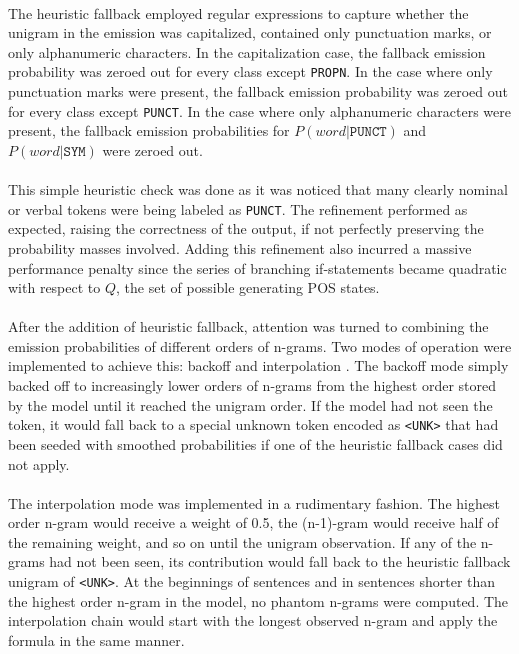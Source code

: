 \documentclass[11pt,a4paper]{article}
\begin{document}
\paragraph{}
The heuristic fallback employed regular expressions to capture whether the unigram
in the emission was capitalized, contained only punctuation marks, or only alphanumeric
characters. In the capitalization case, the fallback emission probability was zeroed out
for every class except \texttt{PROPN}. In the case where only punctuation marks were
present, the fallback emission probability was zeroed out for every class except
\texttt{PUNCT}. In the case where only alphanumeric characters were present, the fallback
emission probabilities for $P(word|\texttt{PUNCT})$ and $P(word|\texttt{SYM})$ were
zeroed out.

\paragraph{}
This simple heuristic check was done as it was noticed that many clearly nominal or
verbal tokens were being labeled as \texttt{PUNCT}. The refinement performed as expected,
raising the correctness of the output, if not perfectly preserving the probability masses
involved. Adding this refinement also incurred a massive performance penalty since
the series of branching if-statements became quadratic with respect to $Q$, the set
of possible generating POS states.

\paragraph{}
After the addition of heuristic fallback, attention was turned to combining the
emission probabilities of different orders of n-grams. Two modes of operation were
implemented to achieve this: backoff and interpolation \cite[49-50]{JurafskyMartin}.
The backoff mode simply backed off to increasingly lower orders of n-grams from the
highest order stored by the model until it reached the unigram order.
If the model had not seen the token, it would fall back to a special unknown token
encoded as \texttt{<UNK>} that had been seeded with smoothed probabilities if one
of the heuristic fallback cases did not apply.

\paragraph{}
The interpolation mode was implemented in a rudimentary fashion. The highest order n-gram
would receive a weight of 0.5, the (n-1)-gram would receive half of the remaining weight,
and so on until the unigram observation. If any of the n-grams had not been seen, its
contribution would fall back to the heuristic fallback unigram of \texttt{<UNK>}.
At the beginnings of sentences and in sentences shorter than the highest order n-gram
in the model, no phantom n-grams were computed. The interpolation chain would start with
the longest observed n-gram and apply the formula in the same manner.
\end{document}
